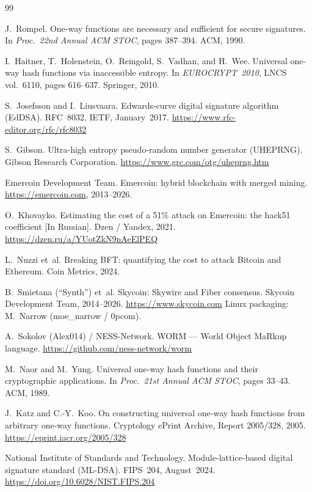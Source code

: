 \documentclass[12pt,a4paper]{article}
\begin{document}
\begin{thebibliography}{99}

J.~Rompel.
One-way functions are necessary and sufficient for secure signatures.
In \textit{Proc.\ 22nd Annual ACM STOC}, pages 387--394. ACM, 1990.

I.~Haitner, T.~Holenstein, O.~Reingold, S.~Vadhan, and H.~Wee.
Universal one-way hash functions via inaccessible entropy.
In \textit{EUROCRYPT~2010}, LNCS vol.~6110, pages 616--637.
Springer, 2010.

S.~Josefsson and I.~Liusvaara.
Edwards-curve digital signature algorithm (EdDSA).
RFC~8032, IETF, January~2017.
\url{https://www.rfc-editor.org/rfc/rfc8032}

S.~Gibson.
Ultra-high entropy pseudo-random number generator (UHEPRNG).
Gibson Research Corporation.
\url{https://www.grc.com/otg/uheprng.htm}

Emercoin Development Team.
Emercoin: hybrid blockchain with merged mining.
\url{https://emercoin.com}, 2013--2026.

O.~Khovayko.
Estimating the cost of a 51\% attack on Emercoin: the hack51
coefficient [In Russian].
Dzen / Yandex, 2021.
\url{https://dzen.ru/a/YUotZkN9nAeElPEQ}

L.~Nuzzi et~al.
Breaking BFT: quantifying the cost to attack Bitcoin and Ethereum.
Coin Metrics, 2024.

B.~Smietana (``Synth'') et~al.
Skycoin: Skywire and Fiber consensus.
Skycoin Development Team, 2014--2026.
\url{https://www.skycoin.com}
Linux packaging: M.~Narrow (moe\_narrow / 0pcom).

A.~Sokolov (Alex014) / NESS-Network.
WORM --- World Object MaRkup language.
\url{https://github.com/ness-network/worm}

M.~Naor and M.~Yung.
Universal one-way hash functions and their cryptographic applications.
In \textit{Proc.\ 21st Annual ACM STOC}, pages 33--43. ACM, 1989.

J.~Katz and C.-Y.~Koo.
On constructing universal one-way hash functions from arbitrary
one-way functions.
Cryptology ePrint Archive, Report 2005/328, 2005.
\url{https://eprint.iacr.org/2005/328}

National Institute of Standards and Technology.
Module-lattice-based digital signature standard (ML-DSA).
FIPS~204, August~2024.
\url{https://doi.org/10.6028/NIST.FIPS.204}


\end{thebibliography}
\end{document}
